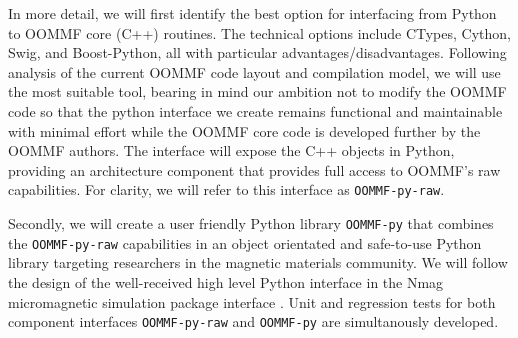 \begin{workpackage}[id=component-architecture,wphases=0-48!.5,
  title=Component Architecture,lead=UV,
  PSRM=46,UVRM=8,SARM=16, USORM=6, UORM=19, LLRM=14, UJFRM=6, UGRM=14]
\begin{tasklist}
\begin{task}[lead=USO,id=oommf-python-interface,title=Python interface for OOMMF micromagnetic simulation library,PM=6,wphases=7-13,partners={SA},issue=57]
  In more detail, we will first identify the best option for interfacing
  from Python to OOMMF core (C++) routines. The technical options
  include CTypes, Cython, Swig, and Boost-Python, all with particular
  advantages/disadvantages. Following analysis of the current OOMMF
  code layout and compilation model, we will use the most suitable
  tool, bearing in mind our ambition not to modify the OOMMF code so
  that the python interface we create remains functional and
  maintainable with minimal effort while the OOMMF core code is
  developed further by the OOMMF authors. 
  The interface will expose the C++ objects in Python, providing
  an architecture component that provides full access to OOMMF's
  raw capabilities. For clarity, we will refer to this interface as
  \texttt{OOMMF-py-raw}. %

  Secondly, we will create a user friendly Python library
  \texttt{OOMMF-py} that combines the \texttt{OOMMF-py-raw}
  capabilities in an object orientated and safe-to-use Python library
  targeting researchers in the magnetic materials community. We will
  follow the design of the well-received high level Python interface
  in the Nmag micromagnetic simulation package \cite{Fischbacher2007a}
  interface \cite{Nmag-url}. Unit and regression tests for both
  component interfaces \texttt{OOMMF-py-raw} and \texttt{OOMMF-py} are
  simultanously developed.





\end{task}
\end{tasklist}
\end{workpackage}
